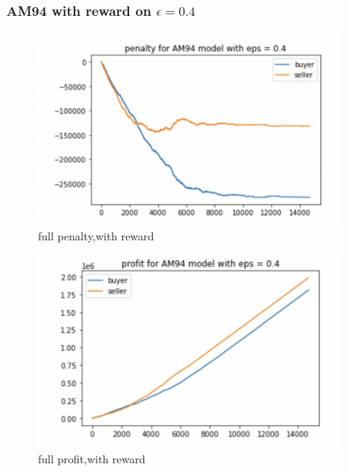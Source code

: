 \documentclass[11pt]{article}
\begin{document}
\subsubsection{AM94 with reward on $\epsilon = 0.4$}

\begin{figure}[H]
	\begin{center}
	\includegraphics[width=0.9\textwidth]{7.PNG}
	\end{center}
	\caption{full penalty,with reward}
	\label{FIG.7}
\end{figure}

\begin{figure}[H]
	\begin{center}
	\includegraphics[width=0.9\textwidth]{8.PNG}
	\end{center}
	\caption{full profit,with reward}
	\label{FIG.8}
\end{figure}
\end{document}
